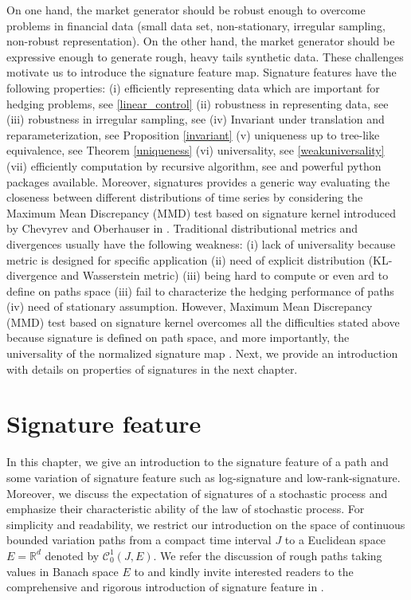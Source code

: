 \documentclass[12pt]{report}
\theoremstyle{definition}
\theoremstyle{remark}
\newcommand{\R}{\mathbb{R}}
\begin{document}
On one hand, the market generator should be robust enough to overcome problems in financial data (small data set, non-stationary, irregular sampling,  non-robust representation). On the other hand, the market generator should be expressive enough to generate rough, heavy tails synthetic data. These challenges motivate us to introduce the signature feature map. Signature features have the following properties: (i) efficiently representing data which are important for hedging problems, see \eqref{linear_control} (ii) robustness in representing data, see \cite{brigo2019probability} (iii) robustness in irregular sampling, see \cite{liao2019learning} (iv) Invariant under translation and reparameterization, see Proposition \ref{invariant} (v)          uniqueness up to tree-like equivalence, see Theorem \ref{uniqueness} (vi) universality, see \ref{weakuniversality} (vii) efficiently computation by recursive algorithm, see \cite{kiraly2019kernels} and powerful python packages available. Moreover, signatures provides a generic way evaluating the closeness between different distributions of time series by considering the Maximum
Mean Discrepancy (MMD) test \cite{gretton2012kernel} based on signature kernel introduced by Chevyrev and Oberhauser in \cite{chevyrev2018signature}. Traditional distributional metrics and divergences usually have the following weakness: (i) lack of universality because metric is designed for specific application (ii) need of explicit distribution (KL-divergence and Wasserstein metric) (iii) being hard to compute or even ard to define on paths space (iii) fail to characterize the hedging performance of paths (iv) need of stationary assumption. However, Maximum Mean Discrepancy (MMD) test based on signature kernel overcomes all the difficulties stated above because signature is defined on path space, and more importantly, the universality of the normalized signature map \cite{chevyrev2018signature}. Next, we provide an introduction with details on properties of signatures in the next chapter.    



\chapter{Signature feature}\label{signaturefeature}
In this chapter, we give an introduction to the signature feature of a path and some variation of signature feature such as log-signature and low-rank-signature. Moreover, we discuss the expectation of signatures of a stochastic process and emphasize their characteristic ability of the law of stochastic process. For simplicity and readability, we restrict our introduction on the space of continuous bounded variation paths from a compact time interval $J$ to a Euclidean space $E = \R^{d}$ denoted by $\mathcal{C}^{1}_{0}(J,E)$. We refer the discussion of rough paths taking values in Banach space $E$ to \cite{friz2020course, lyons2007differential} and kindly invite interested readers to the comprehensive and rigorous introduction of signature feature in \cite{friz2020course, lyons2007differential}.  
\end{document}
